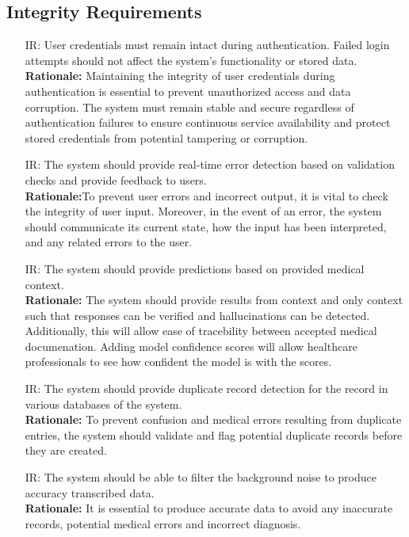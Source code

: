 \documentclass{article}
\newcounter{irnum} %
\begin{document}
\subsection{Integrity Requirements}
\begin{itemize}
    \item [IR\refstepcounter{irnum}\theirnum \label{IR_Autentication}:] User credentials must remain intact during authentication. Failed login attempts should not affect the system's functionality or stored data.\\
    \textbf{Rationale:} Maintaining the integrity of user credentials during authentication is essential to prevent unauthorized access and data corruption. The system must remain stable and secure regardless of authentication failures to ensure continuous service availability and protect stored credentials from potential tampering or corruption.

    \item [IR\refstepcounter{irnum}\theirnum \label{IR_ErrorDetection}:] The system should provide real-time error detection based on validation checks and provide feedback to users.\\
    \textbf{Rationale:}To prevent user errors and incorrect output, it is vital to check the integrity of user input. Moreover, in the event of an error, the system should communicate its current state, how the input has been interpreted, and any related errors to the user.

    \item [IR\refstepcounter{irnum}\theirnum \label{IR_ValidationScore}:] The system should provide predictions based on provided medical context.\\
    \textbf{Rationale:} The system should provide results from context and only context such that responses can be verified and hallucinations can be detected. Additionally, this will allow ease of tracebility between accepted medical documenation. Adding model confidence scores will allow healthcare professionals to see how confident the model is with the scores.
    
    \item [IR\refstepcounter{irnum}\theirnum \label{IR_DuplicateRecordDetection}:] The system should provide duplicate record detection for the record in various databases of the system.\\
    \textbf{Rationale:} To prevent confusion and medical errors resulting from duplicate entries, the system should validate and flag potential duplicate records before they are created.

    \item [IR\refstepcounter{irnum}\theirnum \label{IR_BackNoiseFilter}:] The system should be able to filter the background noise to produce accuracy transcribed data.\\
    \textbf{Rationale:} It is essential to produce accurate data to avoid any inaccurate records, potential medical errors and incorrect diagnosis. 

\end{itemize}
\end{document}
